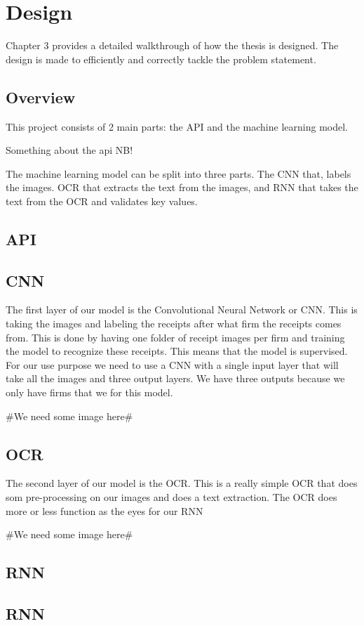 \chapter{Design}
\label{ch:design}
Chapter 3 provides a detailed walkthrough of how the thesis is designed.
The design is made to efficiently and correctly tackle the problem statement.


\section{Overview}\label{sec:Overview}

This project consists of 2 main parts: the API and the machine learning model.

Something about the api NB!

The machine learning model can be split into three parts.
The CNN that, labels the images.
OCR that extracts the text from the images, and RNN that takes the text from the OCR and validates key values.


\section{API}\label{sec:API}


\section{CNN}\label{sec:CNN}

The first layer of our model is the Convolutional Neural Network or CNN. This is taking the images and labeling the receipts after what firm the receipts comes from.
This is done by having one folder of receipt images per firm and training the model to recognize these receipts.
This means that the model is supervised.
For our use purpose we need to use a CNN with a single input layer that will take all the images and three output layers.
We have three outputs because we only have firms that we for this model.

#We need some image here#

\section{OCR}\label{sec:OCR}

The second layer of our model is the OCR. This is a really simple OCR that does som pre-processing on our images and does a text extraction.
The OCR does more or less function as the eyes for our RNN

#We need some image here#

\section{RNN}\label{sec:RNN}

\section{RNN}\label{sec:RNN}
